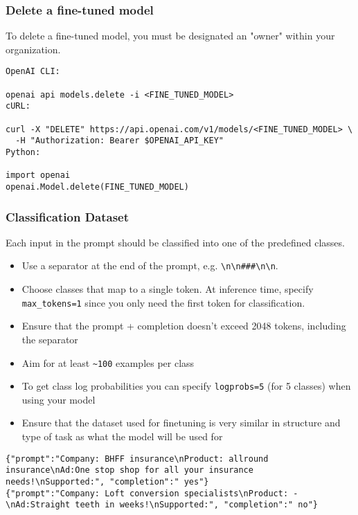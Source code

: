 \begin{frame}[fragile]\frametitle{Delete a fine-tuned model}

To delete a fine-tuned model, you must be designated an "owner" within your organization.

\begin{lstlisting}
OpenAI CLI:

openai api models.delete -i <FINE_TUNED_MODEL>
cURL:

curl -X "DELETE" https://api.openai.com/v1/models/<FINE_TUNED_MODEL> \
  -H "Authorization: Bearer $OPENAI_API_KEY"
Python:

import openai
openai.Model.delete(FINE_TUNED_MODEL)

\end{lstlisting}	

\end{frame}

\begin{frame}[fragile]\frametitle{Classification Dataset}

Each input in the prompt should be classified into one of the predefined classes. 
\begin{itemize}
\item Use a separator at the end of the prompt, e.g. \lstinline|\n\n###\n\n|. 
\item Choose classes that map to a single token. At inference time, specify  \lstinline|max_tokens=1| since you only need the first token for classification.
\item Ensure that the prompt + completion doesn't exceed 2048 tokens, including the separator
\item Aim for at least  \lstinline|~100| examples per class
\item To get class log probabilities you can specify \lstinline|logprobs=5| (for 5 classes) when using your model
\item Ensure that the dataset used for finetuning is very similar in structure and type of task as what the model will be used for
\end{itemize}	 


\begin{lstlisting}
{"prompt":"Company: BHFF insurance\nProduct: allround insurance\nAd:One stop shop for all your insurance needs!\nSupported:", "completion":" yes"}
{"prompt":"Company: Loft conversion specialists\nProduct: -\nAd:Straight teeth in weeks!\nSupported:", "completion":" no"}
\end{lstlisting}	
\end{frame}


